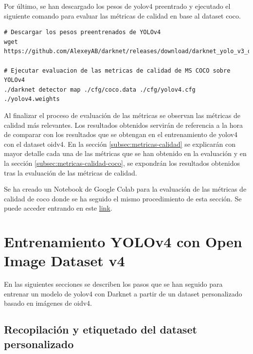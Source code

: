 Por último, se han descargado los pesos de \gls{yolov4} preentrado y ejecutado el siguiente comando para evaluar las métricas de calidad en base al dataset \gls{coco}.

\vspace{0.5cm}
\begin{lstlisting}[language=iPython,caption=Evaluación de las métricas de calidad de MS COCO en YOLOv4 Darknet (3),captionpos=b,label={lst:evaluate-cocodataset3}]
# Descargar los pesos preentrenados de YOLOv4
wget https://github.com/AlexeyAB/darknet/releases/download/darknet_yolo_v3_optimal/yolov4.weights

# Ejecutar evaluacion de las metricas de calidad de MS COCO sobre YOLOv4
./darknet detector map ./cfg/coco.data ./cfg/yolov4.cfg ./yolov4.weights
\end{lstlisting}

Al finalizar el proceso de evaluación de las métricas se observan las métricas de calidad más relevantes. Los resultados obtenidos servirán de referencia a la hora de comparar con los resultados que se obtengan en el entrenamiento de \gls{yolov4} con el dataset \gls{oidv4}. En la sección \ref{subsec:metricas-calidad} se explicarán con mayor detalle cada una de las métricas que se han obtenido en la evaluación y en la sección \ref{subsec:metricas-calidad-coco}, se expondrán los resultados obtenidos tras la evaluación de las métricas de calidad.

Se ha creado un Notebook de Google Colab para la evaluación de las métricas de calidad de \gls{coco} donde se ha seguido el mismo procedimiento de esta sección. Se puede acceder entrando en este \href{https://colab.research.google.com/drive/19P6tIicaeD9vOTCl42eI9PR1nXVlsfoH?usp=sharing}{link}.

\section{Entrenamiento YOLOv4 con Open Image Dataset v4}
\label{sec:train-openimagesv4}

En las siguientes secciones se describen los pasos que se han seguido para entrenar un modelo de \gls{yolov4} con Darknet a partir de un dataset personalizado basado en imágenes de \gls{oidv4}.

\subsection{Recopilación y etiquetado del dataset personalizado}
\label{subsec:recopilacion-etiquetado-custom-dataset}

